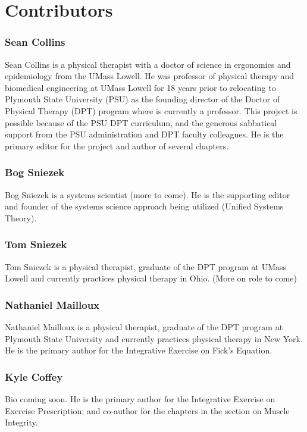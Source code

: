 \chapter*{Contributors}

\subsection*{Sean Collins}
Sean Collins is a physical therapist with a doctor of science in ergonomics and epidemiology from the UMass Lowell. He was professor of physical therapy and biomedical engineering at UMass Lowell for 18 years prior to relocating to Plymouth State University (PSU) as the founding director of the Doctor of Physical Therapy (DPT) program where is currently a professor. This project is possible because of the PSU DPT curriculum, and the generous sabbatical support from the PSU administration and DPT faculty colleagues. He is the primary editor for the project and author of several chapters.

\subsection*{Bog Sniezek}
Bog Sniezek is a systems scientist (more to come). He is the supporting editor and founder of the systems science approach being utilized (Unified Systems Theory).

\subsection*{Tom Sniezek}
Tom Sniezek is a physical therapist, graduate of the DPT program at UMass Lowell and currently practices physical therapy in Ohio. (More on role to come)

\subsection*{Nathaniel Mailloux}
Nathaniel Mailloux is a physical therapist, graduate of the DPT program at Plymouth State University and currently practices physical therapy in New York. He is the primary author for the Integrative Exercise on Fick's Equation.

\subsection*{Kyle Coffey}
Bio coming soon. He is the primary author for the Integrative Exercise on Exercise Prescription; and co-author for the chapters in the section on Muscle Integrity.

\printbibliography[heading=subbibintoc]